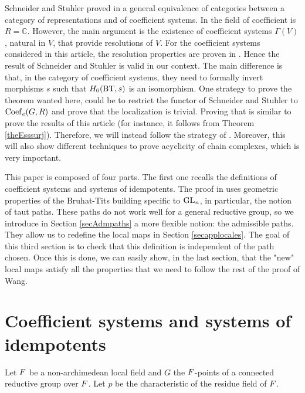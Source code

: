 \documentclass[a4paper,10pt]{amsart}
\begin{document}
Schneider and Stuhler proved in \cite[Thm. V.1]{SchneiderStuhler} a general equivalence of categories between a category of representations and of coefficient systems. In \cite[Thm. V.1]{SchneiderStuhler} the field of coefficient is $R=\mathbb{C}$. However, the main argument is the existence of coefficient systems $\Gamma(V)$, natural in $V$, that provide resolutions of $V$. For the coefficient systems considered in this article, the resolution properties are proven in \cite[Thm. 2.4]{meyer_resolutions_2010}. Hence the result of Schneider and Stuhler is valid in our context. The main difference is that, in the category of coefficient systems, they need to formally invert morphisms $s$ such that $H_0(\bt,s)$ is an isomorphism. One strategy to prove the theorem wanted here, could be to restrict the functor of Schneider and Stuhler to $\operatorname{Coef}_{e}(G,R)$ and prove that the localization is trivial. Proving that is similar to prove the results of this article (for instance, it follows from Theorem \ref{theEsssurj}). Therefore, we will instead follow the strategy of \cite{Wanga}. Moreover, this will also show different techniques to prove acyclicity of chain complexes, which is very important.

\bigskip


This paper is composed of four parts. The first one recalls the definitions of coefficient systems and systems of idempotents. The proof in \cite{Wanga} uses geometric properties of the Bruhat-Tits building specific to $\gl{n}$, in particular, the notion of taut paths. These paths do not work well for a general reductive group, so we introduce in Section \ref{secAdmpaths} a more flexible notion: the admissible paths. They allow us to redefine the local maps in Section \ref{secapplocales}. The goal of this third section is to check that this definition is independent of the path chosen. Once this is done, we can easily show, in the last section, that the "new" local maps satisfy all the properties that we need to follow the rest of the proof of Wang.

\section{Coefficient systems and systems of idempotents}
\label{secsystdecoeff}


Let $F$ be a non-archimedean local field and $G$ the $F$-points of a connected reductive group over $F$. Let $p$ be the characteristic of the residue field of $F$.
\end{document}
